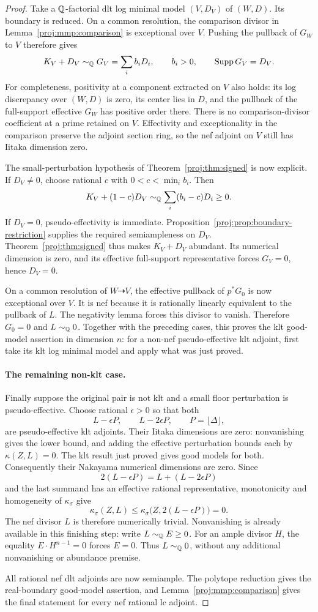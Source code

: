 \begin{proof}
Take a \(\mathbb{Q}\)-factorial dlt log minimal model
\((V,D_V)\) of \((W,D)\).
Its boundary is reduced. On a common resolution, the comparison
divisor in Lemma~\ref{proj:mmp:comparison} is exceptional over \(V\).
Pushing the pullback of \(G_W\) to \(V\) therefore gives
\[
 K_V+D_V\sim_{\mathbb{Q}}G_V=\sum_i b_iD_i,\qquad b_i>0,
 \qquad \operatorname{Supp} G_V=D_V.
\]
For completeness, positivity at a component extracted on \(V\)
also holds: its log discrepancy over \((W,D)\) is zero, its
center lies in \(D\), and the pullback of the full-support
effective \(G_W\) has positive order there.
There is no comparison-divisor coefficient at a prime retained
on \(V\).
Effectivity and exceptionality in the comparison preserve the
adjoint section ring, so the nef adjoint on \(V\) still has
Iitaka dimension zero.

The small-perturbation hypothesis of
Theorem~\ref{proj:thm:signed} is now explicit.
If \(D_V\neq 0\), choose rational \(c\) with
\(0<c<\min_i b_i\). Then
\[
 K_V+(1-c)D_V
 \sim_{\mathbb{Q}}\sum_i(b_i-c)D_i\geq 0.
\]
If \(D_V=0\), pseudo-effectivity is immediate.
Proposition~\ref{proj:prop:boundary-restriction} supplies the
required semiampleness on \(D_V\).
Theorem~\ref{proj:thm:signed} thus makes \(K_V+D_V\) abundant.
Its numerical dimension is zero, and its effective
full-support representative forces \(G_V=0\), hence \(D_V=0\).

On a common resolution of \(W\dashrightarrow V\), the effective
pullback of \(p^*G_0\) is now exceptional over \(V\).
It is nef because it is rationally linearly equivalent to the
pullback of \(L\). The negativity lemma forces this divisor
to vanish. Therefore \(G_0=0\) and \(L\sim_{\mathbb{Q}}0\).
Together with the preceding cases, this proves the klt
good-model assertion in dimension \(n\): for a non-nef
pseudo-effective klt adjoint, first take its klt log minimal
model and apply what was just proved.

\paragraph{The remaining non-klt case.}
Finally suppose the original pair is not klt and a small
floor perturbation is pseudo-effective. Choose rational
\(\epsilon>0\) so that both
\[
 L-\epsilon P,\qquad L-2\epsilon P,
 \qquad P=\lfloor\Delta\rfloor,
\]
are pseudo-effective klt adjoints.
Their Iitaka dimensions are zero: nonvanishing gives the lower
bound, and adding the effective perturbation bounds each by
\(\kappa(Z,L)=0\).
The klt result just proved gives good models for both.
Consequently their Nakayama numerical dimensions are zero.
Since
\[
 2(L-\epsilon P)
   =L+(L-2\epsilon P)
\]
and the last summand has an effective rational representative,
monotonicity and homogeneity of \(\kappa_\sigma\) give
\[
 \kappa_\sigma(Z,L)
 \leq\kappa_\sigma\bigl(Z,2(L-\epsilon P)\bigr)=0.
\]
The nef divisor \(L\) is therefore numerically trivial.
Nonvanishing is already available in this finishing step:
write \(L\sim_{\mathbb{Q}}E\geq 0\).
For an ample divisor \(H\), the equality
\(E\cdot H^{n-1}=0\) forces \(E=0\).
Thus \(L\sim_{\mathbb{Q}}0\), without any additional nonvanishing or
abundance premise.

All rational nef dlt adjoints are now semiample.
The polytope reduction gives the real-boundary good-model
assertion, and Lemma~\ref{proj:mmp:comparison} gives the final
statement for every nef rational lc adjoint.
\end{proof}
